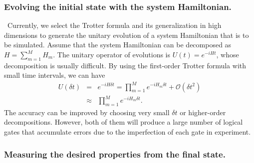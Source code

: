 \documentclass[8.5pt,twoside,twocolumn]{article}
\begin{document}
\subsubsection{Evolving the initial state with the system Hamiltonian.}

\ Currently, we select the Trotter formula\cite{first_quantization_2}
and its generalization in high dimensions\cite{Trotter_1,Trotter_2}
to generate the unitary evolution
of a system Hamiltonian that is to be simulated. Assume that the system Hamiltonian can be decomposed as $H = \sum_{m=1}^MH_m$. The unitary operator of evolutions is $U(t) = e^{-iHt}$, whose decomposition is usually difficult.
By using the first-order Trotter formula with small time intervals, we can have
\begin{eqnarray}\label{trotter}
 U(\delta t) & = & e^{-iH\delta t} = \prod\limits_{m=1}^M e^{-iH_m\delta t}+\mathcal {O}(\delta t^2)\nonumber \\
 & \approx & \prod\limits_{m=1}^M e^{-iH_m\delta t}.
\end{eqnarray}
The accuracy can be improved by choosing very small $\delta t$ or higher-order decompositions. However, both of them will produce a large number of logical gates that accumulate errors due to the imperfection of each gate in experiment.


\subsubsection{Measuring the desired properties from the final state.}
\end{document}
